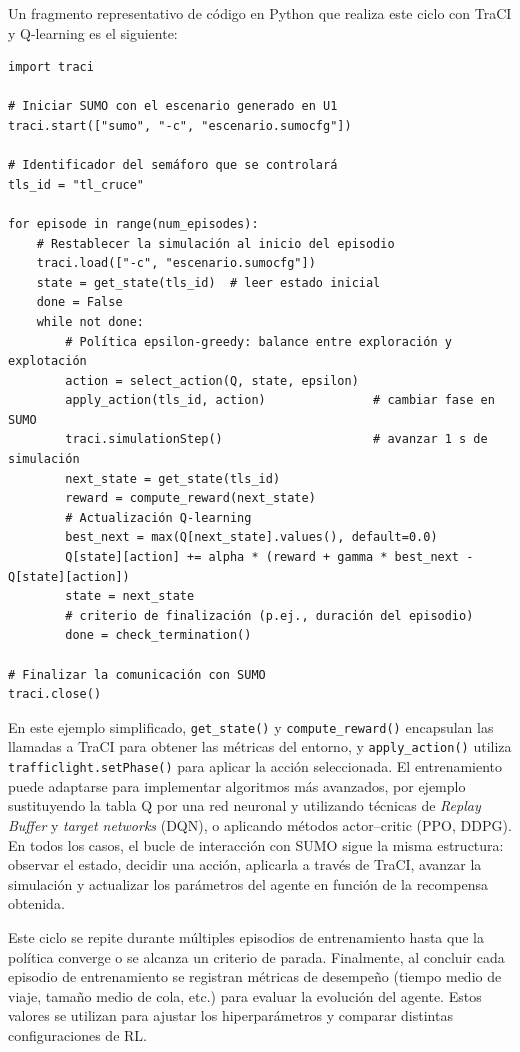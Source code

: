 Un fragmento representativo de código en Python que realiza este
ciclo con TraCI y Q-learning es el siguiente:

\begin{verbatim}
import traci

# Iniciar SUMO con el escenario generado en U1
traci.start(["sumo", "-c", "escenario.sumocfg"])

# Identificador del semáforo que se controlará
tls_id = "tl_cruce"

for episode in range(num_episodes):
    # Restablecer la simulación al inicio del episodio
    traci.load(["-c", "escenario.sumocfg"])
    state = get_state(tls_id)  # leer estado inicial
    done = False
    while not done:
        # Política epsilon-greedy: balance entre exploración y explotación
        action = select_action(Q, state, epsilon)
        apply_action(tls_id, action)               # cambiar fase en SUMO
        traci.simulationStep()                     # avanzar 1 s de simulación
        next_state = get_state(tls_id)
        reward = compute_reward(next_state)
        # Actualización Q-learning
        best_next = max(Q[next_state].values(), default=0.0)
        Q[state][action] += alpha * (reward + gamma * best_next - Q[state][action])
        state = next_state
        # criterio de finalización (p.ej., duración del episodio)
        done = check_termination()

# Finalizar la comunicación con SUMO
traci.close()
\end{verbatim}

En este ejemplo simplificado, \verb|get_state()| y
\verb|compute_reward()| encapsulan las llamadas a TraCI para obtener
las métricas del entorno, y \verb|apply_action()| utiliza
\verb|trafficlight.setPhase()| para aplicar la acción seleccionada.  El
entrenamiento puede adaptarse para implementar algoritmos más
avanzados, por ejemplo sustituyendo la tabla Q por una red neuronal y
utilizando técnicas de \emph{Replay Buffer} y \emph{target networks}
(DQN), o aplicando métodos actor--critic (PPO, DDPG).  En todos los
casos, el bucle de interacción con SUMO sigue la misma estructura:
observar el estado, decidir una acción, aplicarla a través de TraCI,
avanzar la simulación y actualizar los parámetros del agente en función
de la recompensa obtenida.

Este ciclo se repite durante múltiples episodios de entrenamiento
hasta que la política converge o se alcanza un criterio de parada.
Finalmente, al concluir cada episodio de entrenamiento se registran
métricas de desempeño (tiempo medio de viaje, tamaño medio de cola,
etc.) para evaluar la evolución del agente.  Estos valores se
utilizan para ajustar los hiperparámetros y comparar distintas
configuraciones de RL.

